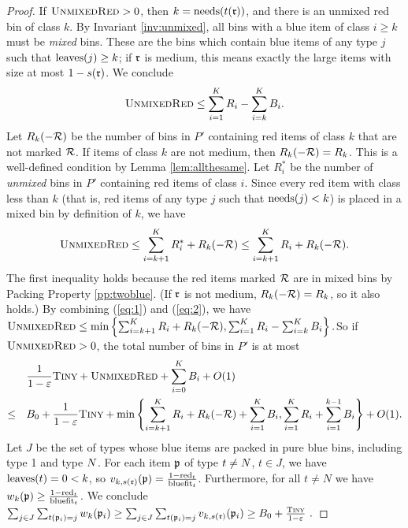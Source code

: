 \begin{proof}
	If $\textsc{UnmixedRed}>0$, then $k=\mathrm{needs}(t(\mathfrak{r}))$, and there is an unmixed red bin of class $k$.
	By Invariant \ref{inv:unmixed}, all bins with a blue item of class $i \ge k$ must be \emph{mixed} bins.
	These are the bins which contain blue items of any type $j$ such that $\mathrm{leaves}(j) \ge k$;
	if $\mathfrak{r}$ is medium, this means exactly the large items with size at most $1-s(\mathfrak{r})$.
	We conclude
	\begin{equation}
	\label{eq:1}
	\textsc{UnmixedRed} \le \sum_{i=1}^{K}R_i - \sum_{i=k}^{K}B_i.
	\end{equation}
	Let $R_k(-\mathcal{R})$ be the number of bins in $P'$ containing 
	red items of class $k$ that are not marked $\mathcal{R}$.
	If items of class $k$ are not medium, then $R_k(-\mathcal{R})=R_k$.
	This is a well-defined condition by Lemma \ref{lem:allthesame}.
	Let $R_i^*$ be the number of \emph{unmixed} bins in $P'$ containing red items of class $i$.
	Since every red item with class less than $k$ (that is, red items of any type $j$ such that $\mathrm{needs}(j)<k$)
	is placed in a mixed bin by definition of $k$, we have
	\begin{equation}
	\label{eq:2}
	\textsc{UnmixedRed} \le \sum_{i=k+1}^{K} R_i^* + R_k(-\mathcal{R})
	\le \sum_{i=k+1}^{K} R_i + R_k(-\mathcal{R}).
	\end{equation}
	The first inequality holds because the red items marked $\mathcal{R}$ are in {mixed} bins by Packing Property \ref{pp:twoblue}.	
	(If $\mathfrak{r}$ is not medium, $R_k(-\mathcal{R})=R_k$, so it also holds.)
	By combining (\ref{eq:1}) and (\ref{eq:2}), we have
$	\textsc{UnmixedRed} \le \min\left\{\sum_{i=k+1}^{K} R_i + R_k(-\mathcal{R}), 
	\sum_{i=1}^K R_i - \sum_{i=k}^K B_i
	\right\}.
$So if $\textsc{UnmixedRed} > 0$,	the total number of bins in $P'$ is at most
	\begin{align}
	\nonumber
	& \quad \frac1{1-\varepsilon} \textsc{Tiny} + \textsc{UnmixedRed} + \sum_{i=0}^K B_i + O(1)\\
	\label{eq:min}
	\le & \quad B_0 + \frac1{1-\varepsilon} \textsc{Tiny} + 
	\min\left\{
	\sum_{i=k+1}^K R_i + R_k(-\mathcal{R}) + \sum_{i=1}^K B_i, 
	\sum_{i=1}^K R_i + \sum_{i=1}^{k-1} B_i
	\right\} 
	+ O(1).
	\end{align}
	Let $J$ be the set of types whose blue items are packed in pure blue bins, including type 1 and type $N$. 
	For each item $\mathfrak{p}$ of type $t\not=N$, $t\in J$, we have $\mathrm{leaves}(t)=0<k$, 
	so $v_{k,s(\mathfrak{r})}(\mathfrak{p}) = \frac{1-\mathrm{red}_t}{\mathrm{bluefit}_t}$. Furthermore, for all $t\neq N$ we have $w_k(\mathfrak{p}) \ge \frac{1-\mathrm{red}_t}{\mathrm{bluefit}_t}$.
	We conclude
	$ \sum_{j\in J} \sum_{t(\mathfrak{p}_i)=j} w_k(\mathfrak{p}_i) \ge
	\sum_{j\in J} \sum_{t(\mathfrak{p}_i)=j} v_{k,s(\mathfrak{r})}(\mathfrak{p}_i) \ge B_0+\frac{\textsc{Tiny}}{1-\varepsilon}\ .
	$
	

\end{proof}

